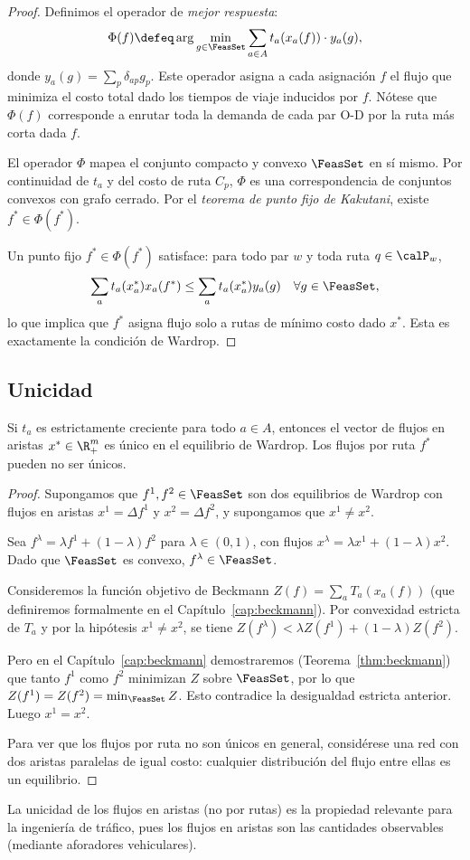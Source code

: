 \begin{proof}
Definimos el operador de \emph{mejor respuesta}:
\[
\Phi(f) \defeq \arg\min_{g \in \FeasSet} \sum_{a \in A} t_a(x_a(f)) \cdot y_a(g),
\]
donde $y_a(g) = \sum_p \delta_{ap} g_p$. Este operador asigna a cada asignación $f$ el flujo que minimiza el costo total dado los tiempos de viaje inducidos por $f$. Nótese que $\Phi(f)$ corresponde a enrutar toda la demanda de cada par O-D por la ruta más corta dada $f$.

El operador $\Phi$ mapea el conjunto compacto y convexo $\FeasSet$ en sí mismo. Por continuidad de $t_a$ y del costo de ruta $C_p$, $\Phi$ es una correspondencia de conjuntos convexos con grafo cerrado. Por el \emph{teorema de punto fijo de Kakutani}, existe $f^* \in \Phi(f^*)$.

Un punto fijo $f^* \in \Phi(f^*)$ satisface: para todo par $w$ y toda ruta $q \in \calP_w$,
\[
\sum_{a} t_a(x_a^*) x_a(f^*) \leq \sum_a t_a(x_a^*) y_a(g) \quad \forall g \in \FeasSet,
\]
lo que implica que $f^*$ asigna flujo solo a rutas de mínimo costo dado $x^*$. Esta es exactamente la condición de Wardrop.
\end{proof}

\subsection{Unicidad}

\begin{theorem}\label{thm:uniqueness}
Si $t_a$ es estrictamente creciente para todo $a \in A$, entonces el vector de flujos en aristas $x^* \in \R^m_+$ es único en el equilibrio de Wardrop. Los flujos por ruta $f^*$ pueden no ser únicos.
\end{theorem}

\begin{proof}
Supongamos que $f^1, f^2 \in \FeasSet$ son dos equilibrios de Wardrop con flujos en aristas $x^1 = \Delta f^1$ y $x^2 = \Delta f^2$, y supongamos que $x^1 \neq x^2$.

Sea $f^\lambda = \lambda f^1 + (1-\lambda) f^2$ para $\lambda \in (0,1)$, con flujos $x^\lambda = \lambda x^1 + (1-\lambda) x^2$. Dado que $\FeasSet$ es convexo, $f^\lambda \in \FeasSet$.

Consideremos la función objetivo de Beckmann $Z(f) = \sum_a T_a(x_a(f))$ (que definiremos formalmente en el Capítulo~\ref{cap:beckmann}). Por convexidad estricta de $T_a$ y por la hipótesis $x^1 \neq x^2$, se tiene $Z(f^\lambda) < \lambda Z(f^1) + (1-\lambda) Z(f^2)$.

Pero en el Capítulo~\ref{cap:beckmann} demostraremos (Teorema~\ref{thm:beckmann}) que tanto $f^1$ como $f^2$ minimizan $Z$ sobre $\FeasSet$, por lo que $Z(f^1) = Z(f^2) = \min_{\FeasSet} Z$. Esto contradice la desigualdad estricta anterior. Luego $x^1 = x^2$.

Para ver que los flujos por ruta no son únicos en general, considérese una red con dos aristas paralelas de igual costo: cualquier distribución del flujo entre ellas es un equilibrio.
\end{proof}

\begin{remark}
La unicidad de los flujos en aristas (no por rutas) es la propiedad relevante para la ingeniería de tráfico, pues los flujos en aristas son las cantidades observables (mediante aforadores vehiculares).
\end{remark}
